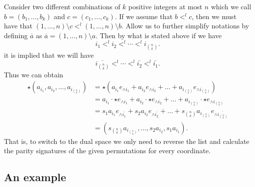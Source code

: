 \documentclass[a4paper,12pt]{book}
\theoremstyle{plain}
\theoremstyle{definition}
\begin{document}
Consider two different combinations of \( k \) positive integers at most \( n \) which we call
\( b = (b_1, \ldots, b_k) \) and \( c = (c_1, \ldots, c_k) \).
If we assume that \( b <^l c \), then we
must have that \( (1, \ldots, n) \setminus c <^l (1, \ldots, n) \setminus b \).
Allow us to further simplify
notations by defining \( \overline{a} \) as \( \overline{a} = (1, \ldots, n) \setminus a \).
Then by what is stated
above if we have
\[
	i_1 <^l i_2 <^l \cdots <^l i_{n \choose k}.
\]
it is implied that we will have
\[
	\overline{i_{n \choose k}} <^l \cdots <^l \overline{i_2} <^l \overline{i_1}.
\]
Thus we can obtain
\begin{align*}
	\star (a_{i_1}, a_{i_2}, \ldots, a_{i_{n \choose k}}) & =
	\star ( a_{i_1} e_{\wedge i_1} + a_{i_2} e_{\wedge i_2} +
	\ldots + a_{i_{n \choose k}} e_{\wedge i_{n \choose k}} ) \\
	& = a_{i_1} \cdot \star e_{\wedge i_1} + a_{i_2} \cdot \star e_{\wedge i_2} +
	\ldots + a_{i_{n \choose k}} \cdot \star e_{\wedge i_{n \choose k}} \\
	& = s_1 a_{i_1} e_{\wedge \overline{i_1}} + s_2 a_{i_2} e_{\wedge \overline{i_2}} +
	\ldots + s_{n \choose k} a_{i_{n \choose k}} e_{\wedge \overline{i_{n \choose k}}} \\
	& = (s_{n \choose k} a_{i_{n \choose k}}, \ldots, s_2 a_{i_2}, s_1 a_{i_1}).
\end{align*}
That is, to switch to the dual space we only need to
reverse the list and calculate the parity signatures
of the given permutations for every coordinate.


\subsection{An example}
\end{document}
